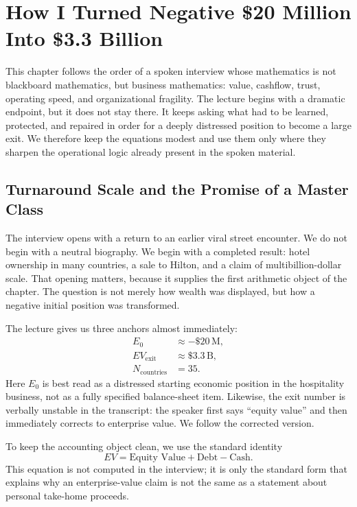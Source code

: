 \chapter{How I Turned Negative \$20 Million Into \$3.3 Billion}

This chapter follows the order of a spoken interview whose mathematics is not blackboard mathematics, but business mathematics: value, cashflow, trust, operating speed, and organizational fragility. The lecture begins with a dramatic endpoint, but it does not stay there. It keeps asking what had to be learned, protected, and repaired in order for a deeply distressed position to become a large exit. We therefore keep the equations modest and use them only where they sharpen the operational logic already present in the spoken material.

\section{Turnaround Scale and the Promise of a Master Class}

The interview opens with a return to an earlier viral street encounter. We do not begin with a neutral biography. We begin with a completed result: hotel ownership in many countries, a sale to Hilton, and a claim of multibillion-dollar scale. That opening matters, because it supplies the first arithmetic object of the chapter. The question is not merely how wealth was displayed, but how a negative initial position was transformed.

The lecture gives us three anchors almost immediately:
\begin{align}
E_0 &\approx -\$20\,\mathrm{M},\\
EV_{\mathrm{exit}} &\approx \$3.3\,\mathrm{B},\\
N_{\mathrm{countries}} &= 35.
\end{align}
Here \(E_0\) is best read as a distressed starting economic position in the hospitality business, not as a fully specified balance-sheet item. Likewise, the exit number is verbally unstable in the transcript: the speaker first says ``equity value'' and then immediately corrects to enterprise value. We follow the corrected version.

\begin{definition}
To keep the accounting object clean, we use the standard identity
\begin{equation}
EV=\text{Equity Value}+\text{Debt}-\text{Cash}.
\end{equation}
This equation is not computed in the interview; it is only the standard form that explains why an enterprise-value claim is not the same as a statement about personal take-home proceeds.
\end{definition}

